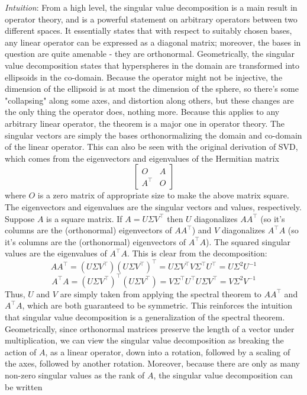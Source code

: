 \documentclass{article}
\begin{document}
\textit{Intuition}: From a high level, the singular value decomposition is a main result in operator theory, and is a powerful statement on arbitrary operators between two different spaces. It essentially states that with respect to suitably chosen bases, any linear operator can be expressed as a diagonal matrix; moreover, the bases in question are quite amenable - they are orthonormal. Geometrically, the singular value decomposition states that hyperspheres in the domain are transformed into ellipsoids in the co-domain. Because the operator might not be injective, the dimension of the ellipsoid is at most the dimension of the sphere, so there's some "collapsing" along some axes, and distortion along others, but these changes are the only thing the operator does, nothing more. Because this applies to any arbitrary linear operator, the theorem is a major one in operator theory. The singular vectors are simply the bases orthonormalizing the domain and co-domain of the linear operator. This can also be seen with the original derivation of SVD, which comes from the eigenvectors and eigenvalues of the Hermitian matrix
$$ \begin{bmatrix}
    O & A \\
    A^\intercal & O
\end{bmatrix} $$
where $ O $ is a zero matrix of appropriate size to make the above matrix square. The eigenvectors and eigenvalues are the singular vectors and values, respectively.
\newline
Suppose $ A $ is a square matrix. If $ A = U \Sigma V^\intercal $ then $ U $ diagonalizes $ A A^\intercal $ (so it's columns are the (orthonormal) eigenvectors of $ A A^\intercal $) and $ V $ diagonalizes $ A^\intercal A$ (so it's columns are the (orthonormal) eigenvectors of $ A^\intercal A $). The squared singular values are the eigenvalues of $ A^\intercal A $. This is clear from the decomposition:
$$ A A^\intercal = (U \Sigma V^\intercal) (U \Sigma V^\intercal)^\intercal = U \Sigma V^\intercal V \Sigma^\intercal U^\intercal = U \Sigma^2 U^{-1} $$
$$ A^\intercal A = (U \Sigma V^\intercal)^\intercal (U \Sigma V^\intercal) = V \Sigma^\intercal U^\intercal U \Sigma V^\intercal = V \Sigma^2 V^{-1} $$
Thus, $ U $ and $ V $ are simply taken from applying the spectral theorem to $ A A^\intercal $ and $ A^\intercal A $, which are both guaranteed to be symmetric. This reinforces the intuition that singular value decomposition is a generalization of the spectral theorem.
\newline
Geometrically, since orthonormal matrices preserve the length of a vector under multiplication, we can view the singular value decomposition as breaking the action of $ A $, as a linear operator, down into a rotation, followed by a scaling of the axes, followed by another rotation. Moreover, because there are only as many non-zero singular values as the rank of $ A $, the singular value decomposition can be written
\end{document}
